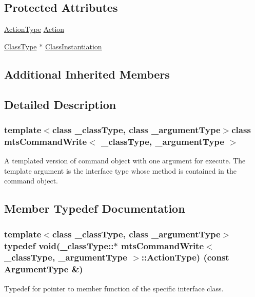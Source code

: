 \subsection*{Protected Attributes}
\begin{DoxyCompactItemize}
\item 
\hyperlink{classmts_command_write_adb59c0a9491a687d96877bb27516b0e7}{Action\+Type} \hyperlink{classmts_command_write_affee375369797c3ffb3aba6578d33b23}{Action}
\item 
\hyperlink{classmts_command_write_aeccc8c434133c4adae34916b42ad493c}{Class\+Type} $\ast$ \hyperlink{classmts_command_write_accc06c909f9145a73c5e56ea64e08872}{Class\+Instantiation}
\end{DoxyCompactItemize}
\subsection*{Additional Inherited Members}


\subsection{Detailed Description}
\subsubsection*{template$<$class \+\_\+class\+Type, class \+\_\+argument\+Type$>$class mts\+Command\+Write$<$ \+\_\+class\+Type, \+\_\+argument\+Type $>$}

A templated version of command object with one argument for execute. The template argument is the interface type whose method is contained in the command object. 

\subsection{Member Typedef Documentation}
\hypertarget{classmts_command_write_adb59c0a9491a687d96877bb27516b0e7}{}
\subsubsection[{Action\+Type}]{\setlength{\rightskip}{0pt plus 5cm}template$<$class \+\_\+class\+Type, class \+\_\+argument\+Type$>$ typedef void(\+\_\+class\+Type\+::$\ast$ {\bf mts\+Command\+Write}$<$ \+\_\+class\+Type, \+\_\+argument\+Type $>$\+::Action\+Type) (const {\bf Argument\+Type} \&)}\label{classmts_command_write_adb59c0a9491a687d96877bb27516b0e7}
Typedef for pointer to member function of the specific interface class. \hypertarget{classmts_command_write_aa8ff942dbc4caedb34d83a5d6bf47c10}{}
